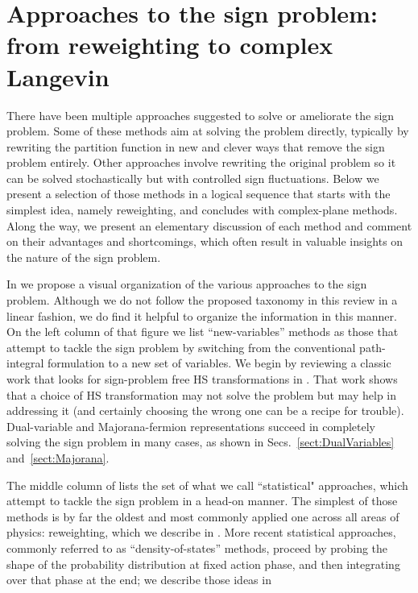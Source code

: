\documentclass[../main.tex]{subfiles}
\begin{document}
\section{\label{sect:genformal} Approaches to the sign problem: from reweighting to complex Langevin}

There have been multiple approaches suggested to solve or ameliorate the sign problem.  Some of these methods aim at solving the problem directly,
typically by rewriting the partition function in new and clever ways that remove the sign problem entirely. Other approaches involve rewriting the original problem
so it can be solved stochastically but with controlled sign fluctuations. Below we present a selection of those methods in a logical sequence that starts with
the simplest idea, namely reweighting, and concludes with complex-plane methods.
Along the way, we present an elementary discussion of each method and comment on their advantages and shortcomings, which often result in valuable insights on
the nature of the sign problem.

In  we propose a visual organization of the various approaches to the sign problem. Although we do not follow the proposed
taxonomy in this review in a linear fashion, we do find it helpful to organize the information in this manner. On the left column of that figure we list
``new-variables'' methods as those that attempt to tackle the sign problem by switching from the conventional path-integral formulation to a new set of
variables. We begin by reviewing a classic work that looks for sign-problem free HS transformations in .
That work shows that a choice of HS transformation may not solve the problem but may help in addressing it
(and certainly choosing the wrong one can be a recipe for trouble). Dual-variable and Majorana-fermion representations
succeed in completely solving the sign problem in many cases, as shown in Secs.~\ref{sect:DualVariables}
and~\ref{sect:Majorana}.

The middle column of  lists the set of what we call ``statistical" approaches, which attempt to tackle
the sign problem in a head-on manner. The simplest of those methods is by far the oldest and most commonly applied one across
all areas of physics: reweighting, which we describe in . More recent statistical approaches,
commonly referred to as ``density-of-states'' methods, proceed by probing the shape of the probability distribution at fixed action
phase, and then integrating over that phase at the end; we describe those ideas in 
\end{document}
